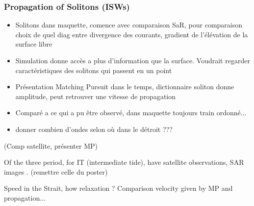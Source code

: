 \subsubsection{Propagation of Solitons (ISWs)}

\begin{itemize}
\item Solitons dans maquette, comence avec comparaison SaR, pour comparaison choix de quel diag entre divergence  des courants, gradient de l'élévation de la surface libre
\item Simulation donne accès a plus d'information que la surface. Voudrait regarder caractéristiques des solitons qui passent en un point 
\item Présentation Matching Pursuit dans le temps, dictionnaire soliton donne amplitude, peut retrouver une vitesse de propagation
\item Comparé a ce qui a pu être observé, dans maquette toujours train ordonné...
\item donner combien d'ondes selon où dans le détroit ???
\end{itemize}


(Comp satellite, présenter MP)

Of the three period, for IT (intermediate tide), have satellite observations, SAR images . (remettre celle du poster)



Speed in the Strait, how relaxation ? Comparison velocity given by MP and propagation...


